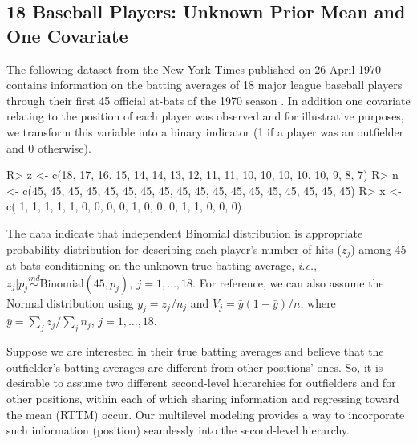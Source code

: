 \documentclass[article]{jss}
\begin{document}
\subsection[Unknown Second-level Mean and One Covariate]{18 Baseball Players: Unknown Prior Mean and One Covariate}

The following dataset from the New York Times published on 26 April 1970 contains information on the batting averages of 18 major league baseball players through their first 45 official at-bats of the 1970 season \citep{1975}. In addition one covariate relating to the position of each player was observed and for illustrative purposes, we transform this variable into a binary indicator (1 if a player was an outfielder and 0 otherwise).
\begin{CodeChunk}
\begin{CodeInput}
R> z <- c(18, 17, 16, 15, 14, 14, 13, 12, 11, 11, 10, 10, 10, 10, 10,  9,  8,  7)
R> n <- c(45, 45, 45, 45, 45, 45, 45, 45, 45, 45, 45, 45, 45, 45, 45, 45, 45, 45)
R> x <- c( 1,  1,  1,  1,  1,  0,  0,  0,  0,  1,  0,  0,  0,  1,  1,  0,  0,  0) 
\end{CodeInput}
\end{CodeChunk}


The data indicate that independent Binomial distribution is appropriate probability distribution for describing each player's number of hits ($z_{j}$) among 45 at-bats conditioning on the unknown true batting average, \emph{i.e.}, $z_{j}\vert p_{j}\stackrel{ind}{\sim} \textrm{Binomial}(45, p_{j}), ~j=1, \ldots, 18$. For reference, we can also assume the Normal distribution using $y_{j}=z_{j} / n_{j}$ and $V_{j}=\bar{y}(1-\bar{y})/n$, where $\bar{y}=\sum_{j} z_{j} / \sum_{j} n_{j}$, $j=1,\ldots, 18$. 



Suppose we are interested in their true batting averages and believe that the outfielder's batting averages are different from other positions' ones.  So, it is desirable to assume two different second-level hierarchies for outfielders and for other positions, within each of which sharing information and regressing toward the mean (RTTM) occur. Our multilevel modeling provides a way to incorporate such information (position) seamlessly into the second-level hierarchy.
\end{document}
